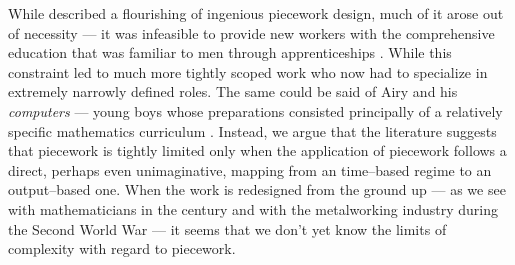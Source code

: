 \documentclass[trackingWork]{subfiles}
\begin{document}
While \citeauthor{hart2013rise} described a flourishing of ingenious piecework design,
much of it arose out of necessity ---
it was infeasible to provide new workers with
the comprehensive education that was familiar to men through apprenticeships
\cite{hart2013rise}.
While this constraint led to much more tightly scoped work
who now had to specialize in extremely narrowly defined roles.
The same could be said of Airy and his \textit{computers}
--- young boys whose preparations consisted principally of
a relatively specific mathematics curriculum
\cite{grier2013computers}.
Instead, we argue that the literature suggests that
piecework is tightly limited only when the application of piecework follows
a direct, perhaps even unimaginative,
mapping from an time--based regime to an output--based one.
When the work is redesigned from the ground up 
--- as we see with mathematicians in the  century and
with the metalworking industry during the Second World War ---
it seems that we don't yet know the limits of complexity with regard to piecework.
\end{document}
